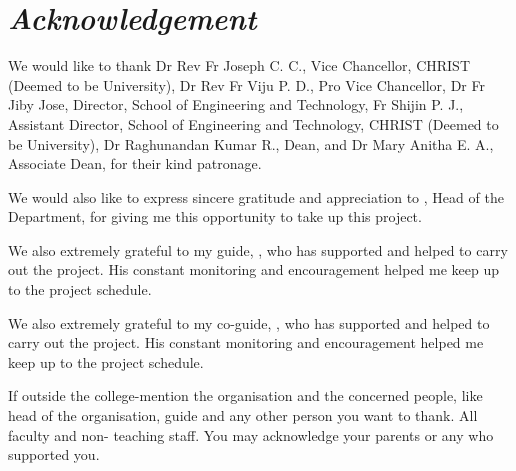 \chapter*{\textbf{\textit{Acknowledgement}}}

\begingroup
\setlength{\parskip}{1cm}
\setlength{\parindent}{0pt}

We would like to thank Dr Rev Fr Joseph C. C., Vice Chancellor, CHRIST (Deemed
to be University), Dr Rev Fr Viju P. D., Pro Vice Chancellor, Dr Fr Jiby Jose,
Director, School of Engineering and Technology, Fr Shijin P. J., Assistant Director,
School of Engineering and Technology, CHRIST (Deemed to be University), Dr
Raghunandan Kumar R., Dean, and Dr Mary Anitha E. A., Associate Dean, for their
kind patronage.

We would also like to express sincere gratitude and appreciation to \textbf{\HODName},
Head of the Department, \textbf{\DepartmentName} for giving me this opportunity to take up this
project.

We also extremely grateful to my guide, \textbf{\GuideName}, who has supported and helped
to carry out the project. His constant monitoring and encouragement helped me keep
up to the project schedule.

We also extremely grateful to my co-guide, \textbf{\IndustryGuideName}, who has supported
and helped to carry out the project. His constant monitoring and encouragement helped
me keep up to the project schedule.

If outside the college-mention the organisation and the concerned people, like head of the
organisation, guide and any other person you want to thank. All faculty and non-
teaching staff. You may acknowledge your parents or any who supported you.

\endgroup
